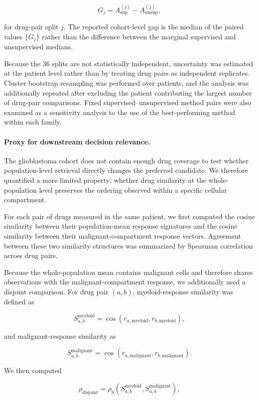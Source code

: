 \documentclass[11pt,letterpaper]{article}
\begin{document}
$$
G_j
=
A^{(j)}_{\mathrm{sup}}
-
A^{(j)}_{\mathrm{unsup}},
$$

for drug-pair split $j$. The reported cohort-level gap is the median of the paired values
$\{G_j\}$ rather than the difference between the marginal supervised and unsupervised medians.

Because the 36 splits are not statistically independent, uncertainty was estimated at the patient
level rather than by treating drug pairs as independent replicates. Cluster bootstrap resampling
was performed over patients, and the analysis was additionally repeated after excluding the
patient contributing the largest number of drug-pair comparisons. Fixed supervised--unsupervised
method pairs were also examined as a sensitivity analysis to the use of the best-performing method
within each family.

\paragraph{Proxy for downstream decision relevance.}
The glioblastoma cohort does not contain enough drug coverage to test whether population-level
retrieval directly changes the preferred candidate. We therefore quantified a more limited
property: whether drug similarity at the whole-population level preserves the ordering observed
within a specific cellular compartment.

For each pair of drugs measured in the same patient, we first computed the cosine similarity
between their population-mean response signatures and the cosine similarity between their
malignant-compartment response vectors. Agreement between these two similarity structures was
summarized by Spearman correlation across drug pairs.

Because the whole-population mean contains malignant cells and therefore shares observations with
the malignant-compartment response, we additionally used a disjoint comparison. For drug pair
$(a,b)$, myeloid-response similarity was defined as

$$
S^{\mathrm{myeloid}}_{a,b}
=
\cos
\left(
r_{a,\mathrm{myeloid}},
r_{b,\mathrm{myeloid}}
\right),
$$

and malignant-response similarity as

$$
S^{\mathrm{malignant}}_{a,b}
=
\cos
\left(
r_{a,\mathrm{malignant}},
r_{b,\mathrm{malignant}}
\right).
$$

We then computed

$$
\rho_{\mathrm{disjoint}}
=
\rho_{\mathrm{S}}
\left(
S^{\mathrm{myeloid}}_{a,b},
S^{\mathrm{malignant}}_{a,b}
\right),
$$
\end{document}

